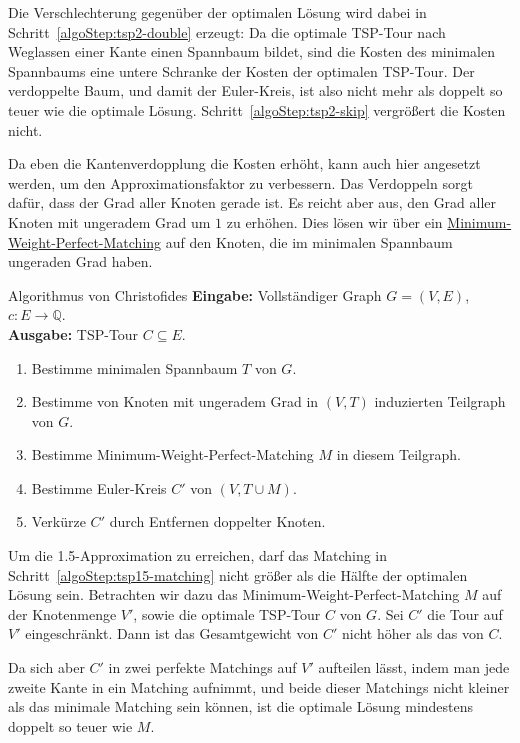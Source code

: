 \documentclass{panikzettel}
\begin{document}
Die Verschlechterung gegenüber der optimalen Lösung wird dabei in Schritt~\ref{algoStep:tsp2-double} erzeugt: Da die optimale TSP-Tour nach Weglassen einer Kante einen Spannbaum bildet, sind die Kosten des minimalen Spannbaums eine untere Schranke der Kosten der optimalen TSP-Tour. Der verdoppelte Baum, und damit der Euler-Kreis, ist also nicht mehr als doppelt so teuer wie die optimale Lösung. Schritt~\ref{algoStep:tsp2-skip} vergrößert die Kosten nicht.

Da eben die Kantenverdopplung die Kosten erhöht, kann auch hier angesetzt werden, um den Approximationsfaktor zu verbessern.
Das Verdoppeln sorgt dafür, dass der Grad aller Knoten gerade ist. Es reicht aber aus, den Grad aller Knoten mit ungeradem Grad um $1$ zu erhöhen. Dies lösen wir über ein \hyperref[sec:min-weight-perfect-matching]{Minimum-Weight-Perfect-Matching} auf den Knoten, die im minimalen Spannbaum ungeraden Grad haben.

\begin{algo}{Algorithmus von Christofides}
\label{algo:tsp-15-approx}
\textbf{Eingabe:} Vollständiger Graph $G = (V,E)$, $c : E \to \mathbb{Q}$.\\
\textbf{Ausgabe:} TSP-Tour $C \subseteq E$.
\tcblower
\begin{enumerate}
    \item Bestimme minimalen Spannbaum $T$ von $G$.
    \item Bestimme von Knoten mit ungeradem Grad in $(V,T)$ induzierten Teilgraph von $G$.
    \item\label{algoStep:tsp15-matching} Bestimme Minimum-Weight-Perfect-Matching $M$ in diesem Teilgraph.
    \item Bestimme Euler-Kreis $C'$ von $(V, T \cup M)$.
    \item Verkürze $C'$ durch Entfernen doppelter Knoten.
\end{enumerate}
\end{algo}

Um die 1.5-Approximation zu erreichen, darf das Matching in Schritt~\ref{algoStep:tsp15-matching} nicht größer als die Hälfte der optimalen Lösung sein. Betrachten wir dazu das Minimum-Weight-Perfect-Matching $M$ auf der Knotenmenge $V'$, sowie die optimale TSP-Tour $C$ von $G$. Sei $C'$ die Tour auf $V'$ eingeschränkt. Dann ist das Gesamtgewicht von $C'$ nicht höher als das von $C$.

Da sich aber $C'$ in zwei perfekte Matchings auf $V'$ aufteilen lässt, indem man jede zweite Kante in ein Matching aufnimmt, und beide dieser Matchings nicht kleiner als das minimale Matching sein können, ist die optimale Lösung mindestens doppelt so teuer wie $M$.
\end{document}
